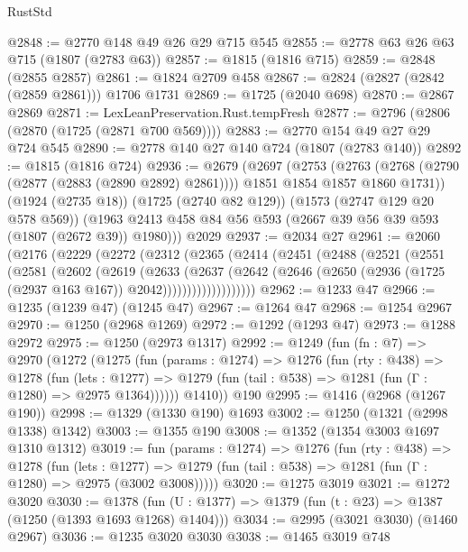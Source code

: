 \begin{lexlean}{RustStd}
\begin{coremodule}
@2848 := @2770 @148 @49 @26 @29 @715 @545
@2855 := @2778 @63 @26 @63 @715 (@1807 (@2783 @63))
@2857 := @1815 (@1816 @715)
@2859 := @2848 (@2855 @2857)
@2861 := @1824 @2709 @458
@2867 := @2824 (@2827 (@2842 (@2859 @2861))) @1706 @1731
@2869 := @1725 (@2040 @698)
@2870 := @2867 @2869
@2871 := LexLeanPreservation.Rust.tempFresh
@2877 := @2796 (@2806 (@2870 (@1725 (@2871 @700 @569))))
@2883 := @2770 @154 @49 @27 @29 @724 @545
@2890 := @2778 @140 @27 @140 @724 (@1807 (@2783 @140))
@2892 := @1815 (@1816 @724)
@2936 := @2679
    (@2697
      (@2753
        (@2763 (@2768 (@2790 (@2877 (@2883 (@2890 @2892) @2861)))) @1851 @1854 @1857 @1860 @1731))
      (@1924 (@2735 @18))
      (@1725 (@2740 @82 @129))
      (@1573 (@2747 @129 @20 @578 @569))
      (@1963 @2413 @458 @84 @56 @593 (@2667 @39 @56 @39 @593 (@1807 (@2672 @39)) @1980)))
    @2029
@2937 := @2034 @27
@2961 := @2060
    (@2176
      (@2229
        (@2272
          (@2312
            (@2365
              (@2414
                (@2451
                  (@2488
                    (@2521
                      (@2551
                        (@2581
                          (@2602
                            (@2619
                              (@2633
                                (@2637
                                  (@2642
                                    (@2646
                                      (@2650
                                        (@2936 (@1725 (@2937 @163 @167)) @2042)))))))))))))))))))
@2962 := @1233 @47
@2966 := @1235 (@1239 @47) (@1245 @47)
@2967 := @1264 @47
@2968 := @1254 @2967
@2970 := @1250 (@2968 @1269)
@2972 := @1292 (@1293 @47)
@2973 := @1288 @2972
@2975 := @1250 (@2973 @1317)
@2992 := @1249
    (fun (fn : @7) =>
    @2970
      (@1272
        (@1275
          (fun (params : @1274) =>
          @1276
            (fun (rty : @438) =>
            @1278
              (fun (lets : @1277) =>
              @1279 (fun (tail : @538) => @1281 (fun (Γ : @1280) => @2975 @1364))))))
        @1410))
    @190
@2995 := @1416 (@2968 (@1267 @190))
@2998 := @1329 (@1330 @190) @1693
@3002 := @1250 (@1321 (@2998 @1338) @1342)
@3003 := @1355 @190
@3008 := @1352 (@1354 @3003 @1697 @1310 @1312)
@3019 := fun (params : @1274) =>
  @1276
    (fun (rty : @438) =>
    @1278
      (fun (lets : @1277) =>
      @1279 (fun (tail : @538) => @1281 (fun (Γ : @1280) => @2975 (@3002 @3008)))))
@3020 := @1275 @3019
@3021 := @1272 @3020
@3030 := @1378 (fun (U : @1377) => @1379 (fun (t : @23) => @1387 (@1250 (@1393 @1693 @1268) @1404)))
@3034 := @2995 (@3021 @3030) (@1460 @2967)
@3036 := @1235 @3020 @3030
@3038 := @1465 @3019 @748

\end{coremodule}
\end{lexlean}
